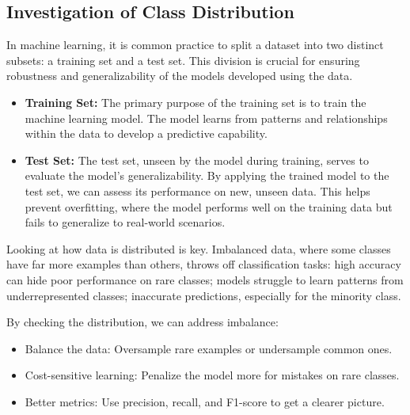\documentclass[runningheads]{paper}
\begin{document}
\subsection{Investigation of Class Distribution}
In machine learning, it is common practice to split a dataset into two distinct
subsets: a training set and a test set. This division is crucial for ensuring 
 robustness and generalizability of the models developed using the data.

\begin{itemize}
    \item \textbf{Training Set:} The primary purpose of the training set is to 
    train the machine 
    learning model. The model learns from patterns and relationships within the data 
    to develop a predictive capability.
    \item \textbf{Test Set:} The test set, unseen by the model during training, 
    serves to evaluate the model's generalizability. By applying the trained 
    model to the test set, we can assess its performance on new, unseen data. 
    This helps prevent overfitting, where the model performs well on the 
    training data but fails to generalize to real-world scenarios.
\end{itemize}

Looking at how data is distributed is key. Imbalanced data, where some classes 
have far more examples than others, throws off classification tasks:
high accuracy can hide poor performance on rare classes; models struggle to 
learn patterns from underrepresented classes; inaccurate predictions, especially 
for the minority class.

By checking the distribution, we can address imbalance:
\begin{itemize}
    \item Balance the data: Oversample rare examples or undersample common ones.
    \item Cost-sensitive learning: Penalize the model more for mistakes on rare classes.
    \item Better metrics: Use precision, recall, and F1-score to get a clearer picture.
\end{itemize}
\end{document}
